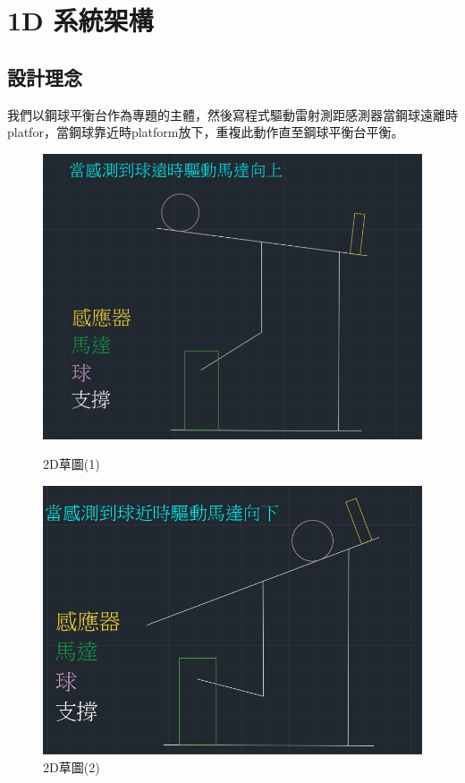 \section*{1D 系統架構}

\subsection*{設計理念}

我們以鋼球平衡台作為專題的主體，然後寫程式驅動雷射測距感測器當鋼球遠離時platfor，當鋼球靠近時platform放下，重複此動作直至鋼球平衡台平衡。

\begin{figure}[h!]
    \centering
    \begin{minipage}[b]{0.45\textwidth}
        \centering
        \includegraphics[width=\textwidth,height=0.22\textheight]{./../images/螢幕擷取畫面 2024-05-22 181158.png}
        \caption{2D草圖(1)}
    \end{minipage}
    \hfill
    \begin{minipage}[b]{0.45\textwidth}
        \centering
        \includegraphics[width=\textwidth,height=0.22\textheight]{./../images/螢幕擷取畫面 2024-05-22 180925.png} 
        \caption{2D草圖(2)}
    \end{minipage}
\end{figure}

